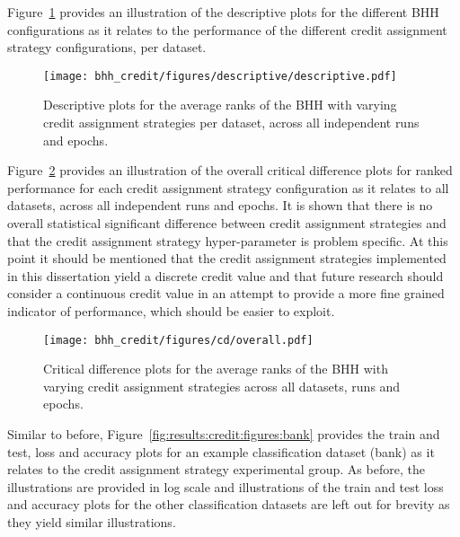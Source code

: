 Figure~\ref{fig:results:credit:descriptive:descriptive} provides an illustration of the descriptive plots for the different \acs{BHH} configurations as it relates to the performance of the different credit assignment strategy configurations, per dataset.

\begin{figure}[htb]
	\centering
	\texttt{[image: bhh\_credit/figures/descriptive/descriptive.pdf]}
	\caption{Descriptive plots for the average ranks of the \acs{BHH} with varying credit assignment strategies per dataset, across all independent runs and epochs.}
	\label{fig:results:credit:descriptive:descriptive}
\end{figure}

Figure~\ref{fig:results:credit:descriptive:cd} provides an illustration of the overall critical difference plots for ranked performance for each credit assignment strategy configuration as it relates to all datasets, across all independent runs and epochs. It is shown that there is no overall statistical significant difference between credit assignment strategies and that the credit assignment strategy hyper-parameter is problem specific. At this point it should be mentioned that the credit assignment strategies implemented in this dissertation yield a discrete credit value and that future research should consider a continuous credit value in an attempt to provide a more fine grained indicator of performance, which should be easier to exploit.

\begin{figure}[htb]
	\centering
	\texttt{[image: bhh\_credit/figures/cd/overall.pdf]}
	\caption{Critical difference plots for the average ranks of the \acs{BHH} with varying credit assignment strategies across all datasets, runs and epochs.}
	\label{fig:results:credit:descriptive:cd}
\end{figure}

Similar to before, Figure~\ref{fig:results:credit:figures:bank} provides the train and test, loss and accuracy plots for an example classification dataset (bank) as it relates to the credit assignment strategy experimental group. As before, the illustrations are provided in log scale and illustrations of the train and test loss and accuracy plots for the other classification datasets are left out for brevity as they yield similar illustrations.


